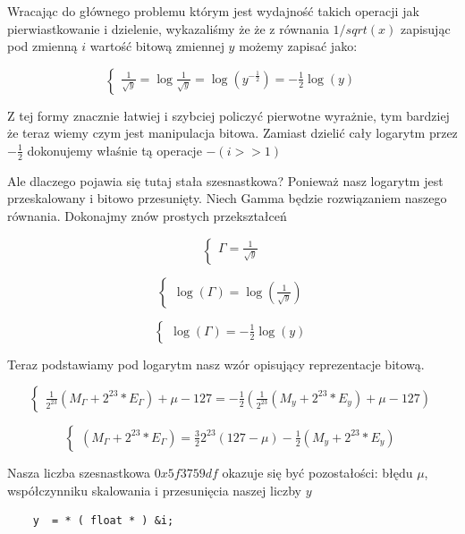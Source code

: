 \documentclass[12pt]{article}
\begin{document}
Wracając do głównego problemu którym jest wydajność takich operacji jak pierwiastkowanie i dzielenie, wykazaliśmy że że z równania $1/sqrt(x)$ zapisując pod zmienną $i$ wartość bitową zmiennej $y$ możemy zapisać jako:

$$ \begin{cases}
\frac{1}{\sqrt{y}} = \log\frac{1}{\sqrt{y}} = \log(y^{-\frac{1}{2}}) = -\frac{1}{2}\log(y)
\end{cases} $$

\noindent Z tej formy znacznie łatwiej i szybciej policzyć pierwotne wyrażnie, tym bardziej że teraz wiemy czym jest manipulacja bitowa. Zamiast dzielić cały logarytm przez $-\frac{1}{2}$ dokonujemy właśnie tą operacje $-(i >> 1)$
\newline

Ale dlaczego pojawia się tutaj stała szesnastkowa? Ponieważ nasz logarytm jest przeskalowany i bitowo przesunięty. Niech Gamma będzie rozwiązaniem naszego równania. Dokonajmy znów prostych przekształceń

$$ \begin{cases}
\Gamma = \frac{1}{\sqrt{y}}
\end{cases} $$

$$ \begin{cases}
\log(\Gamma) = \log(\frac{1}{\sqrt{y}})
\end{cases} $$

$$ \begin{cases}
\log(\Gamma) = -\frac{1}{2}\log(y)
\end{cases} $$

\newpage
\noindent Teraz podstawiamy pod logarytm nasz wzór opisujący reprezentacje bitową.

$$ \begin{cases}
\frac{1}{2^{23}}(M_{\Gamma} + 2^{23} * E_{\Gamma}) + \mu - 127 = -\frac{1}{2}(\frac{1}{2^{23}}(M_y + 2^{23} * E_y) + \mu - 127)
\end{cases} $$

$$ \begin{cases}
(M_{\Gamma} + 2^{23} * E_{\Gamma}) = \frac{3}{2}2^{23}(127 - \mu)-\frac{1}{2}(M_y + 2^{23} * E_y)
\end{cases} $$

\noindent Nasza liczba szesnastkowa $0x5f3759df$ okazuje się być pozostałości: błędu $\mu$, współczynniku skalowania i przesunięcia naszej liczby $y$
\newline
\begin{lstlisting}
    y  = * ( float * ) &i;     
\end{lstlisting}
\end{document}
